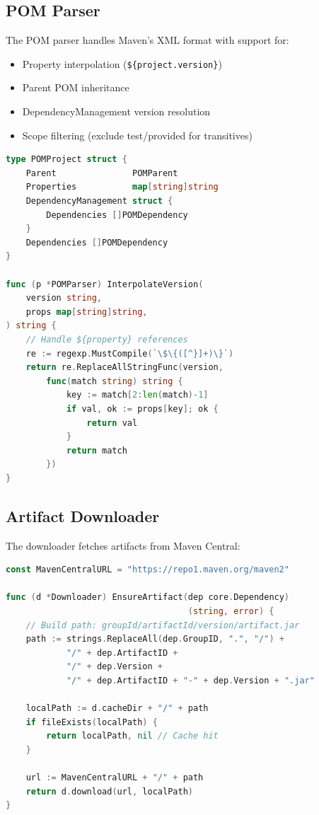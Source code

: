 \documentclass[12pt,a4paper]{report}
\begin{document}
\subsection{POM Parser}

The POM parser handles Maven's XML format with support for:

\begin{itemize}
    \item Property interpolation (\texttt{\$\{project.version\}})
    \item Parent POM inheritance
    \item DependencyManagement version resolution
    \item Scope filtering (exclude test/provided for transitives)
\end{itemize}

\begin{lstlisting}[language=Go, caption=POM Parsing]
type POMProject struct {
    Parent               POMParent
    Properties           map[string]string
    DependencyManagement struct {
        Dependencies []POMDependency
    }
    Dependencies []POMDependency
}

func (p *POMParser) InterpolateVersion(
    version string, 
    props map[string]string,
) string {
    // Handle ${property} references
    re := regexp.MustCompile(`\$\{([^}]+)\}`)
    return re.ReplaceAllStringFunc(version, 
        func(match string) string {
            key := match[2:len(match)-1]
            if val, ok := props[key]; ok {
                return val
            }
            return match
        })
}
\end{lstlisting}

\subsection{Artifact Downloader}

The downloader fetches artifacts from Maven Central:

\begin{lstlisting}[language=Go, caption=Maven Central Download]
const MavenCentralURL = "https://repo1.maven.org/maven2"

func (d *Downloader) EnsureArtifact(dep core.Dependency) 
                                    (string, error) {
    // Build path: groupId/artifactId/version/artifact.jar
    path := strings.ReplaceAll(dep.GroupID, ".", "/") +
            "/" + dep.ArtifactID + 
            "/" + dep.Version +
            "/" + dep.ArtifactID + "-" + dep.Version + ".jar"
    
    localPath := d.cacheDir + "/" + path
    if fileExists(localPath) {
        return localPath, nil // Cache hit
    }
    
    url := MavenCentralURL + "/" + path
    return d.download(url, localPath)
}
\end{lstlisting}
\end{document}
